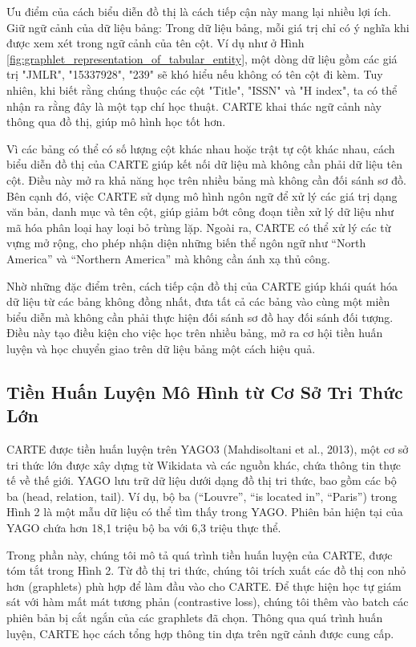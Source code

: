 \documentclass{article}
\begin{document}
Ưu điểm của cách biểu diễn đồ thị là cách tiếp cận này mang lại nhiều lợi ích. Giữ ngữ cảnh của dữ liệu bảng: Trong dữ liệu bảng, mỗi giá trị chỉ có ý nghĩa khi được xem xét trong ngữ cảnh của tên cột. Ví dụ như ở Hình \ref{fig:graphlet_representation_of_tabular_entity}, một dòng dữ liệu gồm các giá trị "JMLR", "15337928", "239" sẽ khó hiểu nếu không có tên cột đi kèm. Tuy nhiên, khi biết rằng chúng thuộc các cột "Title", "ISSN" và "H index", ta có thể nhận ra rằng đây là một tạp chí học thuật. CARTE khai thác ngữ cảnh này thông qua đồ thị, giúp mô hình học tốt hơn.

Vì các bảng có thể có số lượng cột khác nhau hoặc trật tự cột khác nhau, cách biểu diễn đồ thị của CARTE giúp kết nối dữ liệu mà không cần phải dữ liệu tên cột. Điều này mở ra khả năng học trên nhiều bảng mà không cần đối sánh sơ đồ. Bên cạnh đó, việc CARTE sử dụng mô hình ngôn ngữ để xử lý các giá trị dạng văn bản, danh mục và tên cột, giúp giảm bớt công đoạn tiền xử lý dữ liệu như mã hóa phân loại hay loại bỏ trùng lặp. Ngoài ra, CARTE có thể xử lý các từ vựng mở rộng, cho phép nhận diện những biến thể ngôn ngữ như “North America” và “Northern America” mà không cần ánh xạ thủ công.

Nhờ những đặc điểm trên, cách tiếp cận đồ thị của CARTE giúp khái quát hóa dữ liệu từ các bảng không đồng nhất, đưa tất cả các bảng vào cùng một miền biểu diễn mà không cần phải thực hiện đối sánh sơ đồ hay đối sánh đối tượng. Điều này tạo điều kiện cho việc học trên nhiều bảng, mở ra cơ hội tiền huấn luyện và học chuyển giao trên dữ liệu bảng một cách hiệu quả.


\subsection{Tiền Huấn Luyện Mô Hình từ Cơ Sở Tri Thức Lớn}
CARTE được tiền huấn luyện trên YAGO3 (Mahdisoltani et al., 2013), một cơ sở tri thức lớn được xây dựng từ Wikidata và các nguồn khác, chứa thông tin thực tế về thế giới. YAGO lưu trữ dữ liệu dưới dạng đồ thị tri thức, bao gồm các bộ ba (head, relation, tail). Ví dụ, bộ ba (“Louvre”, “is located in”, “Paris”) trong Hình 2 là một mẫu dữ liệu có thể tìm thấy trong YAGO. Phiên bản hiện tại của YAGO chứa hơn 18,1 triệu bộ ba với 6,3 triệu thực thể.

Trong phần này, chúng tôi mô tả quá trình tiền huấn luyện của CARTE, được tóm tắt trong Hình 2. Từ đồ thị tri thức, chúng tôi trích xuất các đồ thị con nhỏ hơn (graphlets) phù hợp để làm đầu vào cho CARTE. Để thực hiện học tự giám sát với hàm mất mát tương phản (contrastive loss), chúng tôi thêm vào batch các phiên bản bị cắt ngắn của các graphlets đã chọn. Thông qua quá trình huấn luyện, CARTE học cách tổng hợp thông tin dựa trên ngữ cảnh được cung cấp.
\end{document}
